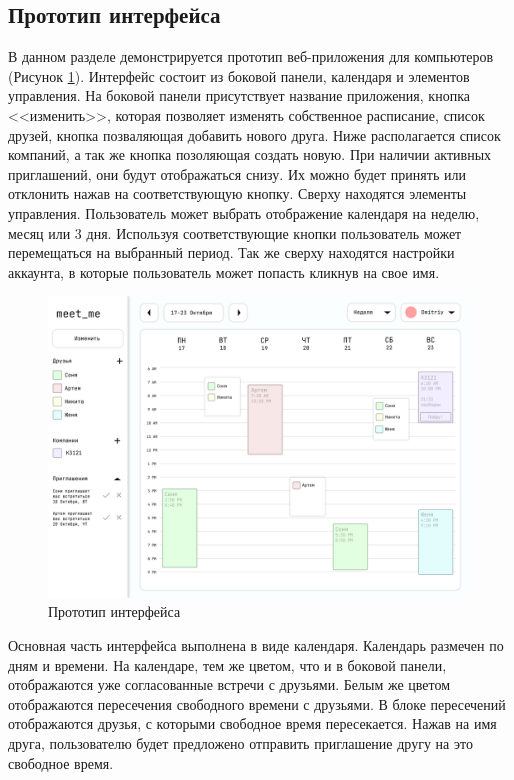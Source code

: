 \documentclass[14pt]{extreport}
\begin{document}
        \newpage
        \subsection{Прототип интерфейса}
        В данном разделе демонстрируется прототип веб-приложения для компьютеров (Рисунок \ref{fig:prototype}). Интерфейс состоит из боковой панели, календаря и элементов управления. На боковой панели присутствует название приложения, кнопка <<изменить>>, которая позволяет изменять собственное расписание, список друзей, кнопка позваляющая добавить нового друга. Ниже располагается список компаний, а так же кнопка позоляющая создать новую. При наличии активных приглашений, они будут отображаться снизу. Их можно будет принять или отклонить нажав на соответствующую кнопку.
        Сверху находятся элементы управления. Пользователь может выбрать отображение календаря на неделю, месяц или 3 дня. Используя соответствующие кнопки пользователь может перемещаться на выбранный период. Так же сверху находятся настройки аккаунта, в которые пользователь может попасть кликнув на свое имя.
        \begin{figure}[h]   
            \centering
            \includegraphics[width=0.9\linewidth]{./img/prototype.png}
            \caption{ Прототип интерфейса}
            \label{fig:prototype}
        \end{figure}

        Основная часть интерфейса выполнена в виде календаря. Календарь размечен по дням и времени.
        На календаре, тем же цветом, что и в боковой панели, отображаются уже согласованные встречи с друзьями. Белым же цветом отображаются пересечения свободного времени с друзьями. В блоке пересечений отображаются друзья, с которыми свободное время пересекается.
        Нажав на имя друга, пользователю будет предложено отправить приглашение другу на это свободное время.
\end{document}
